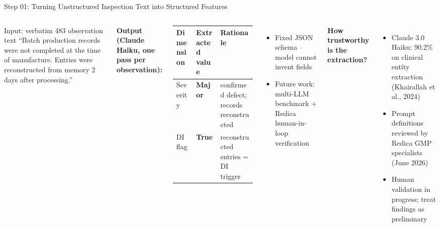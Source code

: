 \documentclass[aspectratio=169,10pt]{beamer}
\begin{document}
\begin{frame}{Step 01: Turning Unstructured Inspection Text into Structured Features}
\begin{columns}[T]
\begin{block}{Input: verbatim 483 observation text}
\scriptsize
``Batch production records were not completed at the time of manufacture. Entries were reconstructed from memory 2 days after processing.''
\end{block}

\vspace{4pt}
\textbf{Output (Claude Haiku, one pass per observation):}

\vspace{2pt}
{\scriptsize
\begin{tabular}{lll}
\toprule
Dimension & Extracted value & Rationale \\
\midrule
Severity & \textbf{Major} & confirmed defect; records reconstructed \\
DI flag  & \textbf{True}  & reconstructed entries = DI trigger \\
\bottomrule
\end{tabular}
}

\vspace{8pt}
{\small
\begin{itemize}
  \setlength{\itemsep}{5pt}
  \item Fixed JSON schema -- model cannot invent fields
  \item Future work: multi-LLM benchmark + Redica human-in-loop verification
\end{itemize}
}

\textbf{How trustworthy is the extraction?}

\vspace{5pt}
\begin{itemize}
  \setlength{\itemsep}{5pt}
  \item Claude 3.0 Haiku: 90.2\% on clinical entity extraction (Khairallah et al., 2024)
  \item Prompt definitions reviewed by Redica GMP specialists (June 2026)
  \item Human validation in progress; treat findings as preliminary
\end{itemize}
\end{columns}
\end{frame}
\end{document}
